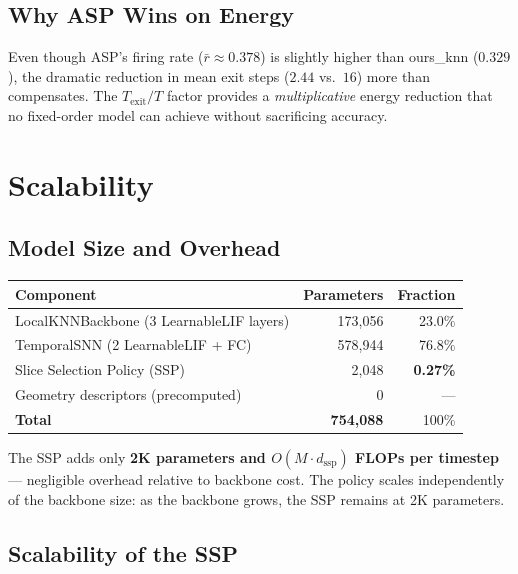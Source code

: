 \documentclass[11pt,a4paper]{article}
\begin{document}
\subsection{Why ASP Wins on Energy}

Even though ASP's firing rate ($\bar{r}\approx0.378$) is slightly higher than ours\_knn ($0.329$),
the dramatic reduction in mean exit steps ($2.44$ vs.\ $16$) more than compensates. The
$T_{\text{exit}}/T$ factor provides a \emph{multiplicative} energy reduction that no fixed-order
model can achieve without sacrificing accuracy.

\section{Scalability}

\subsection{Model Size and Overhead}

\begin{center}
\begin{tabular}{lrr}
\toprule
\textbf{Component} & \textbf{Parameters} & \textbf{Fraction} \\
\midrule
LocalKNNBackbone (3 LearnableLIF layers) & 173{,}056 & 23.0\% \\
TemporalSNN (2 LearnableLIF + FC) & 578{,}944 & 76.8\% \\
Slice Selection Policy (SSP) & 2{,}048 & \textbf{0.27\%} \\
Geometry descriptors (precomputed) & 0 & --- \\
\midrule
\textbf{Total} & \textbf{754{,}088} & 100\% \\
\bottomrule
\end{tabular}
\end{center}

The SSP adds only \textbf{2K parameters and $O(M \cdot d_{\text{ssp}})$ FLOPs per timestep} ---
negligible overhead relative to backbone cost. The policy scales independently of the backbone size:
as the backbone grows, the SSP remains at 2K parameters.

\subsection{Scalability of the SSP}
\end{document}
